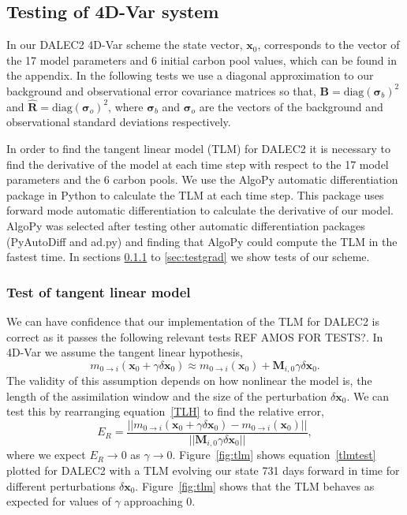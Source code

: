\documentclass[11pt]{article}
\begin{document}
\subsection{Testing of 4D-Var system}

In our DALEC2 4D-Var scheme the state vector, $\textbf{x}_0$, corresponds to the vector of the 17 model parameters and 6 initial carbon pool values, which can be found in the appendix. In the following tests we use a diagonal approximation to our background and observational error covariance matrices so that, 
$\textbf{B}=\text{diag}(\bm{\sigma}_b)^2$ and $\hat{\textbf{R}}=\text{diag}(\bm{\sigma}_o )^2$,
where $\bm{\sigma}_b$ and $\bm{\sigma}_o$ are the vectors of the background and observational standard deviations respectively.

In order to find the tangent linear model (TLM) for DALEC2 it is necessary to find the derivative of the model at each time step with respect to the 17 model parameters and the 6 carbon pools. We use the AlgoPy automatic differentiation package in Python to calculate the TLM at each time step. This package uses forward mode automatic differentiation to calculate the derivative of our model. AlgoPy was selected after testing other automatic differentiation packages (PyAutoDiff and ad.py) and finding that AlgoPy could compute the TLM in the fastest time. In sections \ref{sec:testtlm} to \ref{sec:testgrad} we show tests of our scheme.

\subsubsection{Test of tangent linear model} \label{sec:testtlm}

We can have confidence that our implementation of the TLM for DALEC2 is correct as it passes the following relevant tests REF AMOS FOR TESTS?. In 4D-Var we assume the tangent linear hypothesis,
\begin{equation}
m_{0\rightarrow i}(\mathbf{x}_0+\gamma \delta\mathbf{x}_0) \approx m_{0 \rightarrow i}(\mathbf{x}_0) + \mathbf{M}_{i,0}\gamma \delta\mathbf{x}_0. \label{TLH}
\end{equation}
The validity of this assumption depends on how nonlinear the model is, the length of the assimilation window and the size of the perturbation $\delta\mathbf{x}_0$. We can test this by rearranging equation~\ref{TLH} to find the relative error,
\begin{equation}
E_R=\frac{||m_{0\rightarrow i}(\mathbf{x}_0+\gamma \delta\mathbf{x}_0) - m_{0 \rightarrow i}(\mathbf{x}_0)||}{||\mathbf{M}_{i,0}\gamma\delta\mathbf{x}_0||}, \label{tlmtest}
\end{equation}
where we expect $E_R \rightarrow 0$ as $\gamma \rightarrow 0$. Figure~\ref{fig:tlm} shows equation~\ref{tlmtest} plotted for DALEC2 with a TLM evolving our state 731 days forward in time for different perturbations $\delta \textbf{x}_0$. Figure~\ref{fig:tlm} shows that the TLM behaves as expected for values of $\gamma$ approaching $0$.
\end{document}
